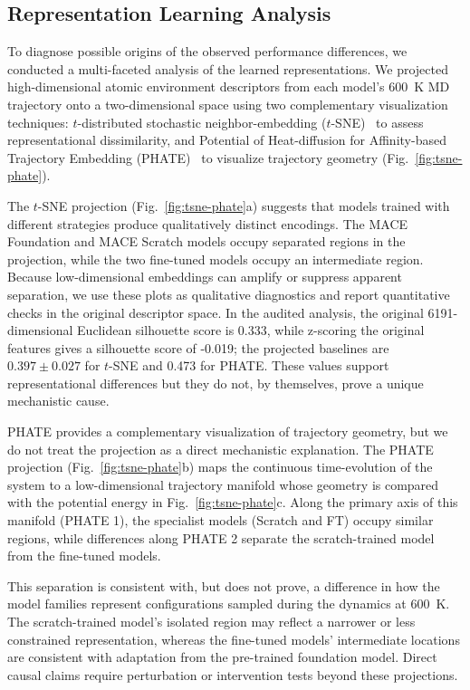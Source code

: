 \documentclass[pdflatex,sn-mathphys-num]{sn-jnl}%
\theoremstyle{thmstyleone}%
\theoremstyle{thmstyletwo}%
\theoremstyle{thmstylethree}%
\begin{document}
\subsection{Representation Learning Analysis}

To diagnose possible origins of the observed performance differences, we conducted a multi-faceted analysis of the learned representations. We projected high-dimensional atomic environment descriptors from each model's 600~K MD trajectory onto a two-dimensional space using two complementary visualization techniques: $t$-distributed stochastic neighbor-embedding ($t$-SNE)~\citep{maaten2008visualizing} to assess representational dissimilarity, and Potential of Heat-diffusion for Affinity-based Trajectory Embedding (PHATE)~\citep{moon2019visualizing} to visualize trajectory geometry (Fig.~\ref{fig:tsne-phate}).

The $t$-SNE projection (Fig.~\ref{fig:tsne-phate}a) suggests that models trained with different strategies produce qualitatively distinct encodings. The MACE Foundation and MACE Scratch models occupy separated regions in the projection, while the two fine-tuned models occupy an intermediate region. Because low-dimensional embeddings can amplify or suppress apparent separation, we use these plots as qualitative diagnostics and report quantitative checks in the original descriptor space. In the audited analysis, the original 6191-dimensional Euclidean silhouette score is 0.333, while z-scoring the original features gives a silhouette score of -0.019; the projected baselines are $0.397\pm0.027$ for $t$-SNE and 0.473 for PHATE. These values support representational differences but they do not, by themselves, prove a unique mechanistic cause.

PHATE provides a complementary visualization of trajectory geometry, but we do not treat the projection as a direct mechanistic explanation. The PHATE projection (Fig.~\ref{fig:tsne-phate}b) maps the continuous time-evolution of the system to a low-dimensional trajectory manifold whose geometry is compared with the potential energy in Fig.~\ref{fig:tsne-phate}c. Along the primary axis of this manifold (PHATE 1), the specialist models (Scratch and FT) occupy similar regions, while differences along PHATE 2 separate the scratch-trained model from the fine-tuned models.

This separation is consistent with, but does not prove, a difference in how the model families represent configurations sampled during the dynamics at 600~K. The scratch-trained model's isolated region may reflect a narrower or less constrained representation, whereas the fine-tuned models' intermediate locations are consistent with adaptation from the pre-trained foundation model. Direct causal claims require perturbation or intervention tests beyond these projections.
\end{document}
